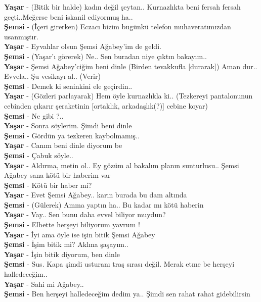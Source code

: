 \documentclass[]{book}
\begin{document}
\textbf{Yaşar} - (Bitik bir halde) kadın değil şeytan.. Kurnazlıkta beni fersah fersah geçti..Meğerse beni iskanil ediyormuş ha..\\
\textbf{Şemsi} - (İçeri girerken) Eczacı bizim bugünkü telefon muhaveratımızdan usanmıştır.\\
\textbf{Yaşar} - Eyvahlar olsun Şemsi Ağabey'im de geldi.\\
\textbf{Şemsi} - (Yaşar'ı görerek) Ne.. Sen buradan niye çıktın bakayım..\\
\textbf{Yaşar} - Şemsi Ağabey'ciğim beni dinle (Birden tevakkufla {[}durarak{]}) Aman dur.. Evvela.. Şu vesikayı al.. (Verir)\\
\textbf{Şemsi} - Demek ki seninkini ele geçirdin..\\
\textbf{Yaşar} - (Gözleri parlayarak) Hem öyle kurnazlıkla ki.. (Tezkereyi pantalonunun cebinden çıkarır şeraketinin {[}ortaklık, arkadaşlık(?){]} cebine koyar)\\
\textbf{Şemsi} - Ne gibi ?..\\
\textbf{Yaşar} - Sonra söylerim. Şimdi beni dinle\\
\textbf{Şemsi} - Gördün ya tezkeren kaybolmamış..\\
\textbf{Yaşar} - Canım beni dinle diyorum be\\
\textbf{Şemsi} - Çabuk söyle..\\
\textbf{Yaşar} - Aldırma, metin ol.. Ey gözüm al bakalım planın sunturlusu.. Şemsi Ağabey sana kötü bir haberim var\\
\textbf{Şemsi} - Kötü bir haber mi?\\
\textbf{Yaşar} - Evet Şemsi Ağabey.. karın burada bu dam altında\\
\textbf{Şemsi} - (Gülerek) Amma yaptın ha.. Bu kadar mı kötü haberin\\
\textbf{Yaşar} - Vay.. Sen bunu daha evvel biliyor muydun?\\
\textbf{Şemsi} - Elbette herşeyi biliyorum yavrum !\\
\textbf{Yaşar} - İyi ama öyle ise işin bitik Şemsi Ağabey\\
\textbf{Şemsi} - İşim bitik mi? Aklına şaşayım..\\
\textbf{Yaşar} - İşin bitik diyorum, ben dinle\\
\textbf{Şemsi} - Sus. Kapa şimdi usturanı traş sırası değil. Merak etme be herşeyi halledeceğim..\\
\textbf{Yaşar} - Sahi mi Ağabey..\\
\textbf{Şemsi} - Ben herşeyi halledeceğim dedim ya.. Şimdi sen rahat rahat gidebilirsin\\
\end{document}
